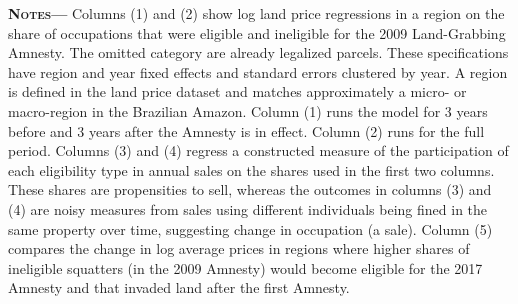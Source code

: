 \documentclass[12pt]{article}
\begin{document}
\begin{center}
\begin{threeparttable}[b]
\begin{tablenotes}[flushleft]
   \item {\justify\singlespacing\footnotesize {\textsc{\textbf{Notes---}}} Columns (1) and (2) show log land price regressions in a region on the share of occupations that were eligible and ineligible for the 2009 Land-Grabbing Amnesty. The omitted category are already legalized parcels. These specifications have region and year fixed effects and standard errors clustered by year. A region is defined in the land price dataset and matches approximately a micro- or macro-region in the Brazilian Amazon. Column (1) runs the model for 3 years before and 3 years after the Amnesty is in effect. Column (2) runs for the full period. Columns (3) and (4) regress a constructed measure of the participation of each eligibility type in annual sales on the shares used in the first two columns. These shares are propensities to sell, whereas the outcomes in columns (3) and (4) are noisy measures from sales using different individuals being fined in the same property over time, suggesting change in occupation (a sale). Column (5) compares the change in log average prices in regions where higher shares of ineligible squatters (in the 2009 Amnesty) would become eligible for the 2017 Amnesty and that invaded land after the first Amnesty.}
    \end{tablenotes}
     \label{tab:6}
\end{threeparttable}
\end{center}

\clearpage





\clearpage


\iffalse 
\end{document}
